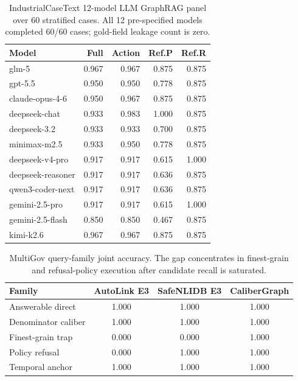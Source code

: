 \documentclass[letterpaper]{article}
\begin{document}
\begin{table}[h]
\centering
\scriptsize
\setlength{\tabcolsep}{2pt}
\begin{tabular}{lrrrr}
\toprule
Model & Full & Action & Ref.P & Ref.R \\
\midrule
glm-5 & 0.967 & 0.967 & 0.875 & 0.875 \\
gpt-5.5 & 0.950 & 0.950 & 0.778 & 0.875 \\
claude-opus-4-6 & 0.950 & 0.967 & 0.875 & 0.875 \\
deepseek-chat & 0.933 & 0.983 & 1.000 & 0.875 \\
deepseek-3.2 & 0.933 & 0.933 & 0.700 & 0.875 \\
minimax-m2.5 & 0.933 & 0.950 & 0.778 & 0.875 \\
deepseek-v4-pro & 0.917 & 0.917 & 0.615 & 1.000 \\
deepseek-reasoner & 0.917 & 0.917 & 0.636 & 0.875 \\
qwen3-coder-next & 0.917 & 0.917 & 0.636 & 0.875 \\
gemini-2.5-pro & 0.917 & 0.917 & 0.615 & 1.000 \\
gemini-2.5-flash & 0.850 & 0.850 & 0.467 & 0.875 \\
kimi-k2.6 & 0.967 & 0.967 & 0.875 & 0.875 \\
\bottomrule
\end{tabular}
\caption{IndustrialCaseText 12-model LLM GraphRAG panel over 60 stratified cases. All 12 pre-specified models completed 60/60 cases; gold-field leakage count is zero.}
\end{table}

\begin{table}[h]
\centering
\scriptsize
\setlength{\tabcolsep}{1.5pt}
\begin{tabular}{lccc}
\toprule
Family & AutoLink E3 & SafeNLIDB E3 & CaliberGraph \\
\midrule
Answerable direct & 1.000 & 1.000 & 1.000 \\
Denominator caliber & 1.000 & 1.000 & 1.000 \\
Finest-grain trap & 0.000 & 0.000 & 1.000 \\
Policy refusal & 0.000 & 1.000 & 1.000 \\
Temporal anchor & 1.000 & 1.000 & 1.000 \\
\bottomrule
\end{tabular}
\caption{MultiGov query-family joint accuracy. The gap concentrates in finest-grain and refusal-policy execution after candidate recall is saturated.}
\end{table}
\end{document}
